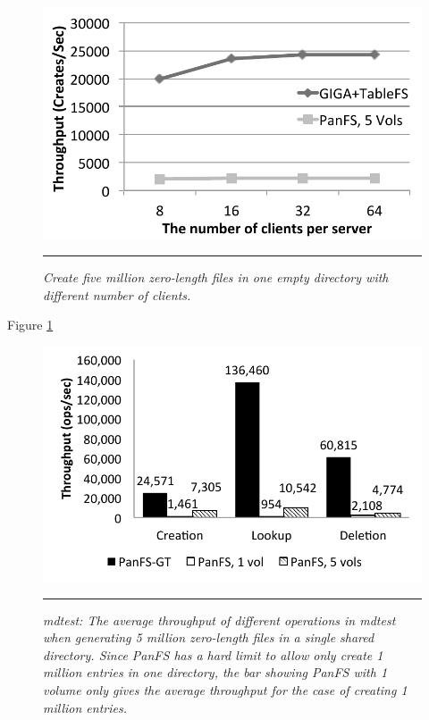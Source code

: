\begin{figure}[t]  %
\centerline{\includegraphics[scale=0.6]{./figs/zero_file_creation_on_panfs}}
\vspace{10pt}
\caption{\normalsize
\textit{Create five million zero-length files in one empty directory
with different number of clients.}
}
\vspace{10pt}
\hrule
\label{graph:creation_clients}
\end{figure}       %

Figure \ref{graph:creation_clients}

\begin{figure}[t]  %
\centerline{\includegraphics[scale=0.6]{./figs/mdtest}}
\vspace{10pt}
\caption{\normalsize
\textit{mdtest:
The average throughput of different operations in mdtest
when generating 5 million zero-length files in a single shared directory.
Since PanFS has a hard limit to allow only create 1 million entries
in one directory, the bar showing PanFS with 1 volume only gives
the average throughput for the case of creating 1 million entries.
}
}
\vspace{10pt}
\hrule
\label{graph:mdtest_ops}
\end{figure}       %


